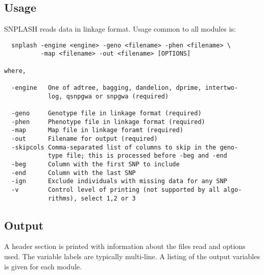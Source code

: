 \subsection{Usage}
SNPLASH reads data in linkage format. Usage common to all modules is:

\begin{verbatim}
  snplash -engine <engine> -geno <filename> -phen <filename> \
          -map <filename> -out <filename> [OPTIONS]

where,

  -engine   One of adtree, bagging, dandelion, dprime, intertwo-
            log, qsnpgwa or snpgwa (required)

  -geno     Genotype file in linkage format (required)
  -phen     Phenotype file in linkage format (required)
  -map      Map file in linkage foramt (required)
  -out      Filename for output (required)
  -skipcols Comma-separated list of columns to skip in the geno-
            type file; this is processed before -beg and -end
  -beg      Column with the first SNP to include
  -end      Column with the last SNP
  -ign      Exclude individuals with missing data for any SNP
  -v        Control level of printing (not supported by all algo-
            rithms), select 1,2 or 3
\end{verbatim}                       
      
\subsection{Output}

A header section is printed with information about the files read and options
used.  The variable labels are typically multi-line.  A listing of the output
variables is given for each module.